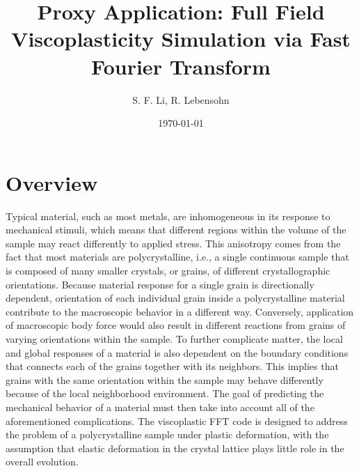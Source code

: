 \documentclass[11pt]{article}
\title{
  Proxy Application:  Full Field Viscoplasticity Simulation via Fast Fourier Transform
}
\author{
  S. F. Li, R. Lebensohn
}
\date{
  \today
     }
\begin{document}
 
\newcommand{\captionfonts}{\slshape}

\makeatletter  %
\long\def\@makecaption#1#2{%
  \vskip\abovecaptionskip
  \sbox\@tempboxa{{\captionfonts #1: #2}}%
  \ifdim \wd\@tempboxa >\hsize
    {\captionfonts #1: #2\par}
  \else
    \hbox to\hsize{\hfil\box\@tempboxa\hfil}%
  \fi
  \vskip\belowcaptionskip}
\makeatother   %
 
 
\maketitle



\section{Overview}
Typical material, such as most metals, are inhomogeneous in its response to mechanical stimuli, which means that different regions within the volume of the sample may react differently to applied stress.  This anisotropy comes from the fact that most materials are polycrystalline, i.e., a single continuous sample that is composed of many smaller crystals, or grains, of different crystallographic orientations.  Because material response for a single grain is directionally dependent, orientation of each individual grain inside a polycrystalline material contribute to the macroscopic behavior in a different way.  Conversely, application of macroscopic body force would also result in different reactions from grains of varying orientations within the sample.  To further complicate matter, the local and global responses of a material is also dependent on the boundary conditions that connects each of the grains together with its neighbors.  This implies that grains with the same orientation within the sample may behave differently because of the local neighborhood environment.  The goal of predicting the mechanical behavior of a material must then take into account all of the aforementioned complications.  The viscoplastic FFT code is designed to address the problem of a polycrystalline sample under plastic deformation, with the assumption that elastic deformation in the crystal lattice plays little role in the overall evolution.
\end{document}
